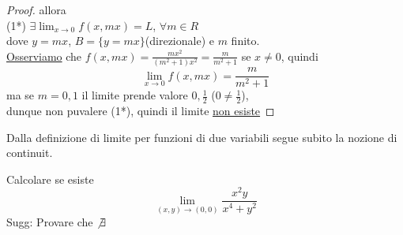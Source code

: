 \begin{exercise}
\begin{enumerate}
\begin{proof}
      allora\\ (1*) $\exists \lim_{x\to 0} f(x,mx) = L$, $\forall m \in R$\\ dove 
      $y = mx$, $B = \{y=mx\}$(direzionale) e $m$ \ace finito.\\
      \underline{Osserviamo} che $f(x,mx) = \frac{mx^2}{(m^2+1)x^2} = \frac{m}{m^2+1}$ se $x\not = 0$, 
      quindi $$\lim_{x\to 0}f(x,mx) = \frac{m}{m^2+1}$$
      ma se $m = 0,1$ il limite prende valore $0, \frac{1}{2}$ ($0 \not = \frac{1}{2}$),\\
      dunque non pu\aco valere (1*), quindi il limite \underline{non esiste}
    \end{proof}
  \end{enumerate}
\end{exercise}
Dalla definizione di limite per funzioni di due variabili segue subito la nozione di continuit\aca.
\begin{exercise}
  Calcolare se esiste $$\lim_{(x,y)\to(0,0)}\frac{x^2y}{x^4+y^2}$$
  Sugg: Provare che $\not \exists$
\end{exercise}